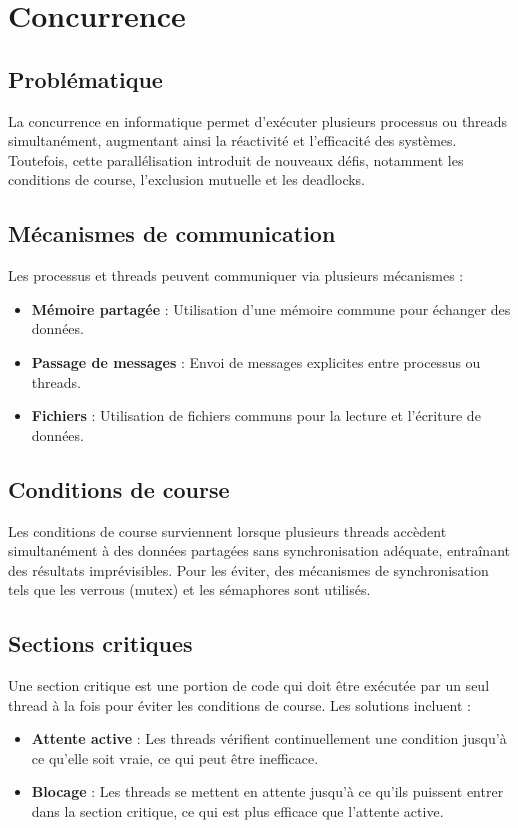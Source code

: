 \section{Concurrence}\label{sec:concurrence}

\subsection{Problématique}
La concurrence en informatique permet d'exécuter plusieurs processus ou threads simultanément, augmentant ainsi la réactivité et l'efficacité des systèmes. 
Toutefois, cette parallélisation introduit de nouveaux défis, notamment les conditions de course, l'exclusion mutuelle et les deadlocks.

\subsection{Mécanismes de communication}
Les processus et threads peuvent communiquer via plusieurs mécanismes :
\begin{itemize}
    \item \textbf{Mémoire partagée} : Utilisation d'une mémoire commune pour échanger des données.
    \item \textbf{Passage de messages} : Envoi de messages explicites entre processus ou threads.
    \item \textbf{Fichiers} : Utilisation de fichiers communs pour la lecture et l'écriture de données.
\end{itemize}

\subsection{Conditions de course}
Les conditions de course surviennent lorsque plusieurs threads accèdent simultanément à des données partagées sans synchronisation adéquate, entraînant des résultats imprévisibles. 
Pour les éviter, des mécanismes de synchronisation tels que les verrous (mutex) et les sémaphores sont utilisés.

\subsection{Sections critiques}
Une section critique est une portion de code qui doit être exécutée par un seul thread à la fois pour éviter les conditions de course. Les solutions incluent :
\begin{itemize}
    \item \textbf{Attente active} : Les threads vérifient continuellement une condition jusqu'à ce qu'elle soit vraie, ce qui peut être inefficace.
    \item \textbf{Blocage} : Les threads se mettent en attente jusqu'à ce qu'ils puissent entrer dans la section critique, ce qui est plus efficace que l'attente active.
\end{itemize}


